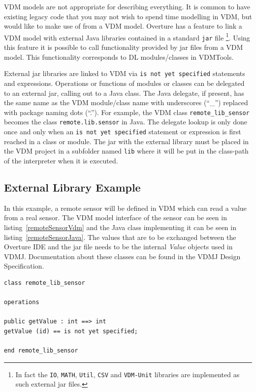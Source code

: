 \documentclass{overturerepchap}
\begin{document}
VDM models are not appropriate for describing everything. It is common
to have existing legacy code that you may not
wish to spend time modelling in VDM, but would like to make use of
from a VDM model. Overture has a feature to link a VDM
model with external Java libraries contained in a standard \texttt{jar} file
\footnote{In fact the \texttt{IO}, \texttt{MATH}, \texttt{Util},
  \texttt{CSV} and \texttt{VDM-Unit} libraries are implemented as such
external jar files.}.
Using this feature it is possible 
to call functionality provided by jar files from a VDM model. This functionality
corresponds to DL modules/classes in VDMTools\cite{DLMan}.

External jar libraries are linked to VDM via
\texttt{is not yet specified} statements and expressions. Operations
or functions of modules or classes can be delegated to an external
jar, calling out to a Java class. The Java delegate, if present, has
the same name as the VDM
module/class name with underscores (``\_'') replaced with package naming
dots (``.''). For example, the VDM class \texttt{remote\_lib\_sensor} becomes
the class \texttt{remote.lib.sensor} in Java. The delegate lookup is only done once and
only when an  \texttt{is not yet specified} statement or expression is first
reached in a class or module. The jar with the external library must be placed in
the VDM project in a subfolder named \texttt{lib} where it will be put in the
class-path of the interpreter when it is executed.

\subsection{External Library Example}
In this example, a remote sensor will be defined in VDM which can read a
value from a real sensor. The VDM model interface of the sensor can be
seen in listing~\ref{remoteSensorVdm} and the Java class
implementing it can be seen in listing~\ref{remoteSensorJava}. The
values that are to be exchanged between the Overture IDE and the jar
file needs to be the internal \emph{Value} objects used in VDMJ. Documentation about
these classes can be found in the VDMJ Design Specification\cite{Battle10}.

\begin{lstlisting}[language=VDM++,label=remoteSensorVdm,caption=Remote sensor VDM class,captionpos=b]
class remote_lib_sensor

operations

public getValue : int ==> int
getValue (id) == is not yet specified;

end remote_lib_sensor
\end{lstlisting}
\end{document}
